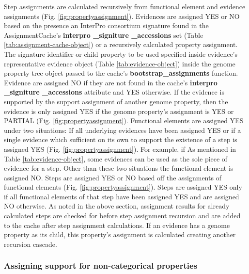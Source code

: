 Step assignments are calculated recursively from functional element and evidence assignments (Fig. \ref{fig:propertyassignment}). Evidences are assigned YES or NO based on the presence an InterPro consortium signature found in the AssignmentCache's \textbf{interpro \_signiture \_accessions} set (Table \ref{tab:assignment-cache-object}) or a recursively calculated property assignment. The signature identifier or child property to be used specified inside evidence's representative evidence object (Table \ref{tab:evidence-object}) inside the genome property tree object passed to the cache's \textbf{bootstrap\_assignments} function. Evidence are assigned NO if they are not found in the cache's \textbf{interpro \_signiture \_accessions} attribute and YES otherwise. If the evidence is supported by the support assignment of another genome property, then the evidence is only assigned YES if the genome property's assignment is YES or PARTIAL (Fig. \ref{fig:propertyassignment}). Functional elements are assigned YES under two situations: If all underlying evidences have been assigned YES or if a single evidence which sufficient on its own to support the existence of a step is assigned YES (Fig. \ref{fig:propertyassignment}). For example, if As mentioned in Table \ref{tab:evidence-object}, some evidences can be used as the sole piece of evidence for a step. Other than these two situations the functional element is assigned NO. Steps are assigned YES or NO based off the assignments of functional elements (Fig. \ref{fig:propertyassignment}). Steps are assigned YES only if all functional elements of that step have been assigned YES and are assigned NO otherwise. As noted in the above section, assignment results for already calculated steps are checked for before step assignment recursion and are added to the cache after step assignment calculations. If an evidence has a genome property as its child, this property's assignment is calculated creating another recursion cascade.

\subsubsection{Assigning support for non-categorical properties}

